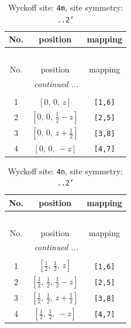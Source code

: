 \documentclass[fleqn,8pt]{jsarticle}
\begin{document}
\renewcommand{\arraystretch}{1.2}
\begin{longtable}{ccc}
\caption{Wyckoff site: {\tt 4m}, site symmetry: {\tt ..2'}}
 \\
 \hline \hline
No. & position & mapping \\ \hline \endfirsthead

\multicolumn{2}{l}{\tablename\ \thetable{}} \\
 \hline \hline
No. & position & mapping \\ \hline \endhead

 \hline \hline
\multicolumn{2}{r}{\footnotesize\it continued ...} \\ \endfoot

 \hline \hline
\multicolumn{2}{r}{} \\ \endlastfoot

1 & $\left[ 0,\, 0,\, z \right]$ & {\tt [1,6]} \\ \hline
2 & $\left[ 0,\, 0,\, \frac{1}{2} - z \right]$ & {\tt [2,5]} \\ \hline
3 & $\left[ 0,\, 0,\, z + \frac{1}{2} \right]$ & {\tt [3,8]} \\ \hline
4 & $\left[ 0,\, 0,\, - z \right]$ & {\tt [4,7]} \\
\end{longtable}
\renewcommand{\arraystretch}{1.2}
\begin{longtable}{ccc}
\caption{Wyckoff site: {\tt 4n}, site symmetry: {\tt ..2'}}
 \\
 \hline \hline
No. & position & mapping \\ \hline \endfirsthead

\multicolumn{2}{l}{\tablename\ \thetable{}} \\
 \hline \hline
No. & position & mapping \\ \hline \endhead

 \hline \hline
\multicolumn{2}{r}{\footnotesize\it continued ...} \\ \endfoot

 \hline \hline
\multicolumn{2}{r}{} \\ \endlastfoot

1 & $\left[ \frac{1}{2},\, \frac{1}{2},\, z \right]$ & {\tt [1,6]} \\ \hline
2 & $\left[ \frac{1}{2},\, \frac{1}{2},\, \frac{1}{2} - z \right]$ & {\tt [2,5]} \\ \hline
3 & $\left[ \frac{1}{2},\, \frac{1}{2},\, z + \frac{1}{2} \right]$ & {\tt [3,8]} \\ \hline
4 & $\left[ \frac{1}{2},\, \frac{1}{2},\, - z \right]$ & {\tt [4,7]} \\
\end{longtable}
\end{document}
